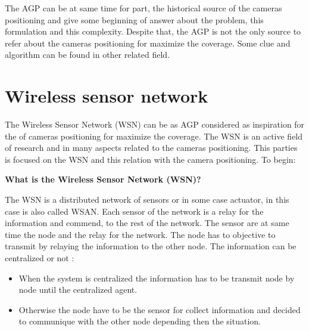 The AGP can be at same time for part, the  historical source of the cameras positioning and give some beginning of answer about the problem, this formulation and this complexity. Despite that, the AGP is not the only source to refer about the cameras positioning for maximize the coverage. Some clue and algorithm can be found in other related field. 


\section{Wireless sensor network }

The Wireless Sensor Network (WSN) can be as AGP considered as inspiration for the  of cameras positioning for maximize the coverage. The WSN is an active field of research and in many aspects related to the cameras positioning. This parties is focused on the WSN and this relation with the camera positioning.  To begin:

\textbf{ What is the Wireless Sensor Network (WSN)? }

 The WSN is a distributed network of sensors or in some case actuator, in this case is also called WSAN. Each sensor of the network is a relay for the information and commend, to the rest of the network.  
The sensor are at same time the node and the relay for the network. The node has to objective to transmit by relaying the information to the other node. 
The information can be centralized or not :
\begin{itemize}
\item When the system is centralized the information has to be transmit node by node until the centralized agent.
\item Otherwise the node have to be the sensor for collect information and decided to communique with the other node depending then the situation. 

\end{itemize}
 
